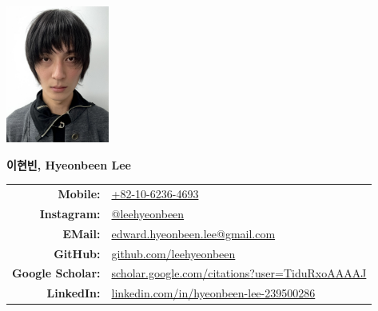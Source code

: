 \documentclass[a4paper,10pt]{extarticle}
\begin{document}
\pagestyle{empty}



\begin{minipage}{0.1\textwidth}
	\begin{flushleft}
		\includegraphics[height=4.5cm]{photo_dlicense.jpeg}
	\end{flushleft}
\end{minipage}
\hfill
\begin{minipage}{0.7\textwidth}
	\begin{flushright}
		\textbf{\Large 이현빈, Hyeonbeen Lee} %
		\newline\newline
		\begin{tabular}{rl}
			\textbf{Mobile: }         & \href{tel:+82-10-6236-4693}{+82-10-6236-4693}                                                                 \\
			\textbf{Instagram: }      & \href{https://www.instagram.com/leehyeonbeen}{@leehyeonbeen}                                                  \\
			\textbf{EMail: }          & \href{mailto:edward.hyeonbeen.lee@gmail.com}{edward.hyeonbeen.lee@gmail.com}                                  \\
			\textbf{GitHub: }         & \href{https://github.com/leehyeonbeen}{github.com/leehyeonbeen}                                               \\
			\textbf{Google Scholar: } & \href{https://scholar.google.com/citations?user=TiduRxoAAAAJ}{scholar.google.com/citations?user=TiduRxoAAAAJ} \\
			\textbf{LinkedIn: }       & \href{https://www.linkedin.com/in/hyeonbeen-lee-239500286/}{linkedin.com/in/hyeonbeen-lee-239500286}
		\end{tabular}
	\end{flushright}

\end{minipage}
\end{document}
